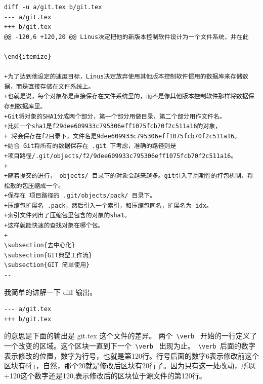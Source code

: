 {\tiny 
\begin{verbatim}
diff -u a/git.tex b/git.tex
--- a/git.tex
+++ b/git.tex
@@ -120,6 +120,20 @@ Linus决定把他的新版本控制软件设计为一个文件系统，并在此

\end{itemize}

+为了达到他设定的速度目标，Linus决定放弃使用其他版本控制软件惯用的数据库来存储数据，而是直接存储在文件系统上。
+也就是说，每个对象都是直接保存在文件系统里的，而不是像其他版本控制软件那样将数据保存到数据库里。
+Git将对象的SHA1分成两个部分，第一个部分用做目录，第二个部分用作文件名。
+比如一个sha1是f29dee609933c795306eff1075fcb70f2c511a16的对象，
+ 将会保存在f2目录下，文件名是9dee609933c795306eff1075fcb70f2c511a16。
+结合 Git将所有的数据保存在 .git 下考虑，准确的路径则是
+项目路径/.git/objects/f2/9dee609933c795306eff1075fcb70f2c511a16。
+
+随着提交的进行， objects/ 目录下的对象会越来越多。git引入了周期性的打包机制，将松散的包压缩成一个。
+保存在 项目路径的 .git/objects/pack/ 目录下。
+压缩包扩展名 .pack，然后引入一个索引，和压缩包同名，扩展名为 idx。
+索引文件列出了压缩包里包含的对象的sha1。
+这样就能快速的查找对象在哪个包。
+
\subsection{去中心化}
\subsection{GIT典型工作流}
\subsection{GIT 简单使用}
-- 
\end{verbatim}
}

\begin{insertnote}

我简单的讲解一下 diff 输出。

{\scriptsize 
\begin{verbatim}
--- a/git.tex
+++ b/git.tex
\end{verbatim}}

的意思是下面的输出是 git.tex 这个文件的差异。 两个\verb @ \verb @ 开始的一行定义了一个改变的区域。这个区块一直到下一个\verb @ \verb @ 出现为止。\verb @ \verb @后面的数字表示修改的位置，数字为行号，也就是第120行。行号后面的数字6表示修改前这个区块有6行，自然，那个20就是修改后区块有20行了。因为只有这一处改动，所以 +120这个数字还是120,表示修改后的区块位于源文件的第120行。

\end{insertnote}


